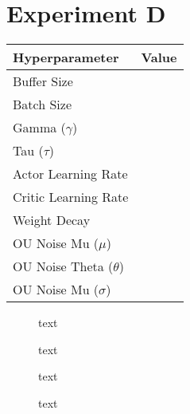 \section{Experiment D}

\begin{minipage}{0.45\textwidth}
	\centering
	\begin{tabular}{lr}
	\toprule
	\textbf{Hyperparameter} & \textbf{Value} \\
	\midrule
	Buffer Size & \\
	Batch Size & \\
	Gamma ($\gamma$) & \\
	Tau ($\tau$) & \\
	Actor Learning Rate & \\
	Critic Learning Rate & \\
	Weight Decay & \\
	OU Noise Mu ($\mu$) & \\
	OU Noise Theta ($\theta$) & \\
	OU Noise Mu ($\sigma$) & \\
	\bottomrule
	\end{tabular}
\end{minipage}
\hspace{1cm}
\begin{minipage}{0.45\textwidth}
	\centering
\end{minipage}

\begin{figure}[h]
	\begin{minipage}{0.45\textwidth}
		\centering
		
		\caption{text}
		\label{fig:5401_raw_reward}
	\end{minipage}
	\hspace{0.75cm}
	\begin{minipage}{0.45\textwidth}
		\centering
		
		\caption{text}
		\label{fig:5402_average_reward}
	\end{minipage}
\end{figure}

\begin{figure}[h]
	\begin{minipage}{0.45\textwidth}
		\centering
		
		\caption{text}
		\label{fig:5403_frequency_response_1}
	\end{minipage}
	\hspace{0.75cm}
	\begin{minipage}{0.45\textwidth}
		\centering
		
		\caption{text}
		\label{fig:5404_frequency_response_2}
	\end{minipage}
\end{figure}

